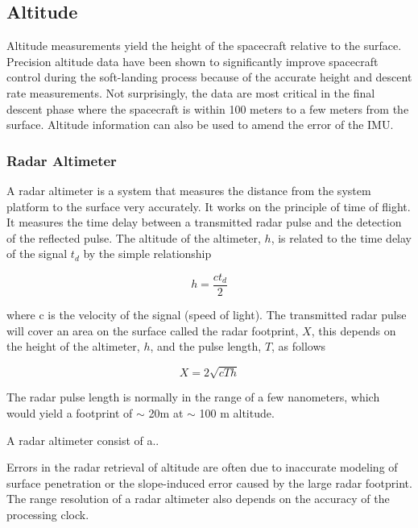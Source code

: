 \subsection{Altitude}
Altitude measurements yield the height of the spacecraft relative to the surface. Precision altitude data have been shown to significantly improve spacecraft control during the soft-landing process because of the accurate height and descent rate measurements. Not surprisingly, the data are most critical in the final descent phase where the spacecraft is within 100 meters to a few meters from the surface. Altitude information can also be used to amend the error of the IMU. 

  


\subsubsection{Radar Altimeter}
A radar altimeter is a system that measures the distance from the system platform to the surface very accurately. It works on the principle of time of flight. It measures the time delay between a transmitted radar pulse and the detection of the reflected pulse. The altitude of the altimeter, $h$, is related to the time delay of the signal $t_d$ by the simple relationship 

\begin{equation}
h=\dfrac{c t_d}{2}
\end{equation}

where c is the velocity of the signal (speed of light). \cite{henning radar} The transmitted radar pulse will cover an area on the surface called the radar footprint, $X$, this depends on the height of the altimeter, $h$, and the pulse length, $T$, as follows

\begin{equation}
X=2\sqrt{cTh}
\end{equation}

The radar pulse length is normally in the range of a few nanometers, which would yield a footprint of $\sim$ 20m at $\sim$ 100 m altitude.

A radar altimeter consist of a..

Errors in the radar retrieval of altitude are often due to inaccurate modeling
of surface penetration or the slope-induced error caused by
the large radar footprint. \cite{http://icesat.gsfc.nasa.gov/icesat/publications/pubs/Brenner-Precision_and_Accuracy_of_Satellite_Radar.pdf} The range resolution of a radar altimeter also depends on the accuracy of the processing clock.

